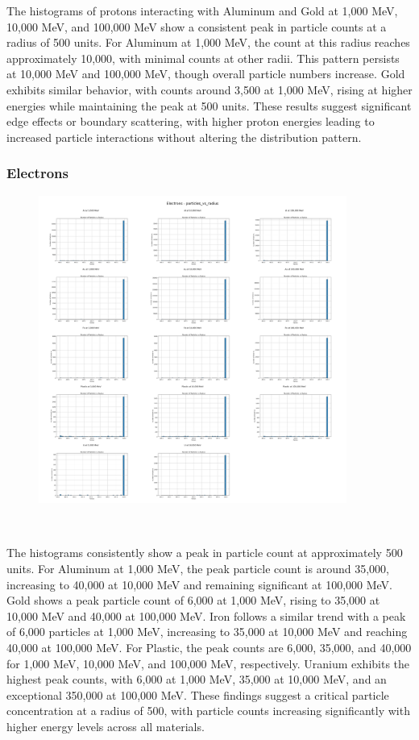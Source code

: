 \documentclass{article}
\begin{document}
\noindent The histograms of protons interacting with Aluminum and Gold at 1,000 MeV, 10,000 MeV, and 100,000 MeV show a consistent peak in particle counts at a radius of 500 units. For Aluminum at 1,000 MeV, the count at this radius reaches approximately 10,000, with minimal counts at other radii. This pattern persists at 10,000 MeV and 100,000 MeV, though overall particle numbers increase. Gold exhibits similar behavior, with counts around 3,500 at 1,000 MeV, rising at higher energies while maintaining the peak at 500 units. These results suggest significant edge effects or boundary scattering, with higher proton energies leading to increased particle interactions without altering the distribution pattern.

\subsubsection{Electrons}

\begin{figure}[H]
\centering
\includegraphics[width=0.9\textwidth]{images/Combined Plots/particles_vs_radius_e-.png}
\end{figure}\

\noindent The histograms consistently show a peak in particle count at approximately 500 units. For Aluminum at 1,000 MeV, the peak particle count is around 35,000, increasing to 40,000 at 10,000 MeV and remaining significant at 100,000 MeV. Gold shows a peak particle count of 6,000 at 1,000 MeV, rising to 35,000 at 10,000 MeV and 40,000 at 100,000 MeV. Iron follows a similar trend with a peak of 6,000 particles at 1,000 MeV, increasing to 35,000 at 10,000 MeV and reaching 40,000 at 100,000 MeV. For Plastic, the peak counts are 6,000, 35,000, and 40,000 for 1,000 MeV, 10,000 MeV, and 100,000 MeV, respectively. Uranium exhibits the highest peak counts, with 6,000 at 1,000 MeV, 35,000 at 10,000 MeV, and an exceptional 350,000 at 100,000 MeV. These findings suggest a critical particle concentration at a radius of 500, with particle counts increasing significantly with higher energy levels across all materials.
\end{document}
